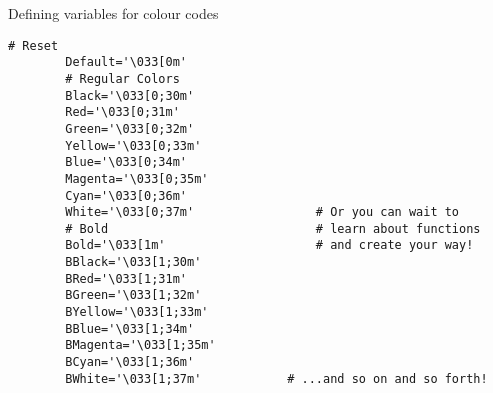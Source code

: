 \begin{frame}[fragile]{Defining variables for colour codes}
    \vspace{-3mm}
    \begin{lstlisting}[style=MyBash, numbers=none]
        # Reset
        Default='\033[0m'
        # Regular Colors
        Black='\033[0;30m'
        Red='\033[0;31m'
        Green='\033[0;32m'
        Yellow='\033[0;33m'
        Blue='\033[0;34m'
        Magenta='\033[0;35m'
        Cyan='\033[0;36m'
        White='\033[0;37m'                 # Or you can wait to
        # Bold                             # learn about functions
        Bold='\033[1m'                     # and create your way!
        BBlack='\033[1;30m'
        BRed='\033[1;31m'
        BGreen='\033[1;32m'
        BYellow='\033[1;33m'
        BBlue='\033[1;34m'
        BMagenta='\033[1;35m'
        BCyan='\033[1;36m'
        BWhite='\033[1;37m'            # ...and so on and so forth!
    \end{lstlisting}
\end{frame}
